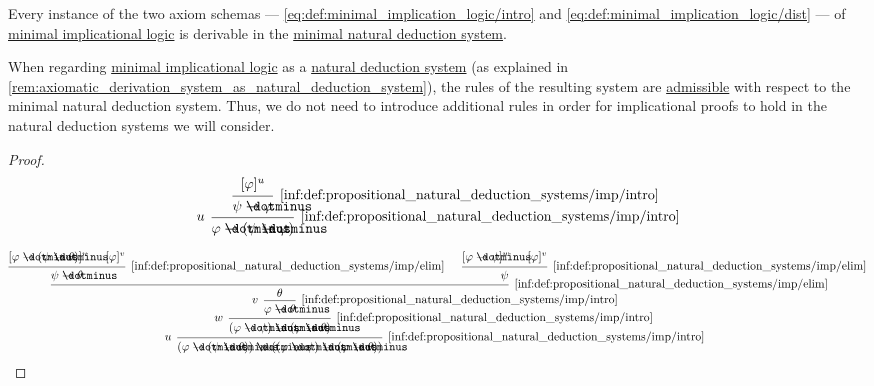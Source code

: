 \begin{proposition}\label{thm:minimal_implicational_logic_axioms_nd_proof}
  Every instance of the two axiom schemas --- \eqref{eq:def:minimal_implication_logic/intro} and \eqref{eq:def:minimal_implication_logic/dist} --- of \hyperref[def:minimal_implication_logic]{minimal implicational logic} is derivable in the \hyperref[def:propositional_natural_deduction_systems]{minimal natural deduction system}.
\end{proposition}
\begin{comments}
  \item When regarding \hyperref[def:minimal_implication_logic]{minimal implicational logic} as a \hyperref[def:abstract_natural_deduction_system]{natural deduction system} (as explained in \cref{rem:axiomatic_derivation_system_as_natural_deduction_system}), the rules of the resulting system are \hyperref[con:inference_rule_admissibility]{admissible} with respect to the minimal natural deduction system. Thus, we do not need to introduce additional rules in order for implicational proofs to hold in the natural deduction systems we will consider.
\end{comments}
\begin{proof}
  \begin{equation*}
    \begin{prooftree}
      \hypo{ [\varphi]^u }
      \infer1[\ref{inf:def:propositional_natural_deduction_systems/imp/intro}]{ \psi \synimplies \varphi }
      \infer[left label=\( u \)]1[\ref{inf:def:propositional_natural_deduction_systems/imp/intro}]{ \varphi \synimplies (\psi \synimplies \varphi) }
    \end{prooftree}
  \end{equation*}

  \begin{equation*}
    \begin{prooftree}
      \hypo{ [\varphi \synimplies (\psi \synimplies \theta)]^u }
      \hypo{ [\varphi]^v }
      \infer2[\ref{inf:def:propositional_natural_deduction_systems/imp/elim}]{ \psi \synimplies \theta }

      \hypo{ [\varphi \synimplies \psi]^w }
      \hypo{ [\varphi]^v }
      \infer2[\ref{inf:def:propositional_natural_deduction_systems/imp/elim}]{ \psi }

      \infer2[\ref{inf:def:propositional_natural_deduction_systems/imp/elim}]{ \theta }

      \infer[left label=\( v \)]1[\ref{inf:def:propositional_natural_deduction_systems/imp/intro}]{ \varphi \synimplies \theta }
      \infer[left label=\( w \)]1[\ref{inf:def:propositional_natural_deduction_systems/imp/intro}]{ (\varphi \synimplies \psi) \synimplies (\varphi \synimplies \theta) }
      \infer[left label=\( u \)]1[\ref{inf:def:propositional_natural_deduction_systems/imp/intro}]{ (\varphi \synimplies (\psi \synimplies \theta)) \synimplies ((\varphi \synimplies \psi) \synimplies (\varphi \synimplies \theta)) }
    \end{prooftree}
  \end{equation*}
\end{proof}

